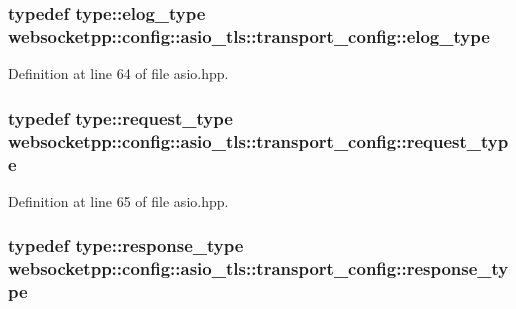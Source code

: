 \subsubsection[{elog\+\_\+type}]{\setlength{\rightskip}{0pt plus 5cm}typedef {\bf type\+::elog\+\_\+type} {\bf websocketpp\+::config\+::asio\+\_\+tls\+::transport\+\_\+config\+::elog\+\_\+type}}\label{structwebsocketpp_1_1config_1_1asio__tls_1_1transport__config_aa5911130efb47b5ce5e75221d1533156}


Definition at line 64 of file asio.\+hpp.

\hypertarget{structwebsocketpp_1_1config_1_1asio__tls_1_1transport__config_ae6034f4e1eb1949147e19d148342eec7}{}
\subsubsection[{request\+\_\+type}]{\setlength{\rightskip}{0pt plus 5cm}typedef {\bf type\+::request\+\_\+type} {\bf websocketpp\+::config\+::asio\+\_\+tls\+::transport\+\_\+config\+::request\+\_\+type}}\label{structwebsocketpp_1_1config_1_1asio__tls_1_1transport__config_ae6034f4e1eb1949147e19d148342eec7}


Definition at line 65 of file asio.\+hpp.

\hypertarget{structwebsocketpp_1_1config_1_1asio__tls_1_1transport__config_a1522be0695a14d9bc31fa6ccdaaf9d4c}{}
\subsubsection[{response\+\_\+type}]{\setlength{\rightskip}{0pt plus 5cm}typedef {\bf type\+::response\+\_\+type} {\bf websocketpp\+::config\+::asio\+\_\+tls\+::transport\+\_\+config\+::response\+\_\+type}}\label{structwebsocketpp_1_1config_1_1asio__tls_1_1transport__config_a1522be0695a14d9bc31fa6ccdaaf9d4c}


